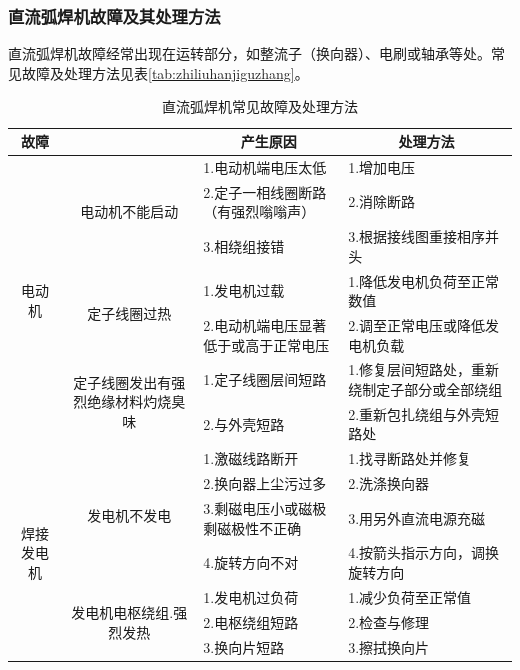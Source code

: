 \documentclass{ctexbook}
\begin{document}
\subsubsection{直流弧焊机故障及其处理方法}
直流弧焊机故障经常出现在运转部分，如整流子（换向器）、电刷或轴承等处。常见故障及处理方法见表\ref{tab:zhiliuhanjiguzhang}。
\begin{table}[htbp]
	\centering
	\caption{直流弧焊机常见故障及处理方法}
	\begin{tabular}{c|c|l|l}
		\toprule
		故障    &       & \multicolumn{1}{c|}{产生原因} & \multicolumn{1}{c}{处理方法} \\
		\midrule
		\multirow{7}[14]{*}{电动机} & \multirow{3}[6]{*}{电动机不能启动} & 1.电动机端电压太低 & 1.增加电压 \\
		\cmidrule{3-4}          &       & 2.定子一相线圈断路（有强烈嗡嗡声） & 2.消除断路 \\
		\cmidrule{3-4}          &       & 3.相绕组接错 & 3.根据接线图重接相序并头 \\
		\cmidrule{2-4}          & \multirow{2}[4]{*}{定子线圈过热} & 1.发电机过载 & 1.降低发电机负荷至正常数值 \\
		\cmidrule{3-4}          &       & 2.电动机端电压显著低于或高于正常电压 & 2.调至正常电压或降低发电机负载 \\
		\cmidrule{2-4}          & \multirow{2}[4]{*}{定子线圈发出有强烈绝缘材料灼烧臭味} & 1.定子线圈层间短路 & 1.修复层间短路处，重新绕制定子部分或全部绕组 \\
		\cmidrule{3-4}          &       & 2.与外壳短路 & 2.重新包扎绕组与外壳短路处 \\
		\midrule
		\multirow{7}[14]{*}{焊接发电机} & \multirow{4}[8]{*}{发电机不发电} & 1.激磁线路断开 & 1.找寻断路处并修复 \\
		\cmidrule{3-4}          &       & 2.换向器上尘污过多 & 2.洗涤换向器 \\
		\cmidrule{3-4}          &       & 3.剩磁电压小或磁极剩磁极性不正确 & 3.用另外直流电源充磁 \\
		\cmidrule{3-4}          &       & 4.旋转方向不对 & 4.按箭头指示方向，调换旋转方向 \\
		\cmidrule{2-4}          & \multirow{3}[6]{*}{发电机电枢绕组.强烈发热} & 1.发电机过负荷 & 1.减少负荷至正常值 \\
		\cmidrule{3-4}          &       & 2.电枢绕组短路 & 2.检查与修理 \\
		\cmidrule{3-4}          &       & 3.换向片短路 & 3.擦拭换向片 \\

\end{tabular}
\end{table}
\end{document}
